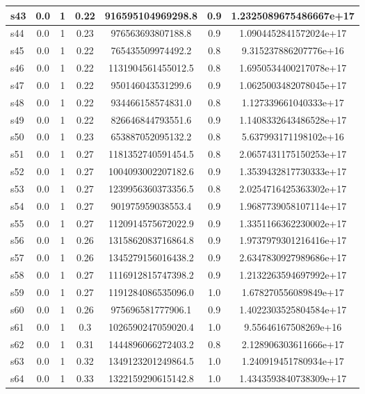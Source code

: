 \documentclass{article}
\begin{document}
\begin{tabular}{|l|c|c|c|c|c|c|}
\hline
s43 &0.0 & 1 & 0.22 & 916595104969298.8 & 0.9 & 1.2325089675486667e+17\\
\hline
s44 &0.0 & 1 & 0.23 & 976563693807188.8 & 0.9 & 1.0904452841572024e+17\\
\hline
s45 &0.0 & 1 & 0.22 & 765435509974492.2 & 0.8 & 9.315237886207776e+16\\
\hline
s46 &0.0 & 1 & 0.22 & 1131904561455012.5 & 0.8 & 1.6950534400217078e+17\\
\hline
s47 &0.0 & 1 & 0.22 & 950146043531299.6 & 0.9 & 1.0625003482078045e+17\\
\hline
s48 &0.0 & 1 & 0.22 & 934466158574831.0 & 0.8 & 1.127339661040333e+17\\
\hline
s49 &0.0 & 1 & 0.22 & 826646844793551.6 & 0.9 & 1.1408332643486528e+17\\
\hline
s50 &0.0 & 1 & 0.23 & 653887052095132.2 & 0.8 & 5.637993171198102e+16\\
\hline
s51 &0.0 & 1 & 0.27 & 1181352740591454.5 & 0.8 & 2.0657431175150253e+17\\
\hline
s52 &0.0 & 1 & 0.27 & 1004093002207182.6 & 0.9 & 1.3539432817730333e+17\\
\hline
s53 &0.0 & 1 & 0.27 & 1239956360373356.5 & 0.8 & 2.0254716425363302e+17\\
\hline
s54 &0.0 & 1 & 0.27 & 901975959038553.4 & 0.9 & 1.9687739058107114e+17\\
\hline
s55 &0.0 & 1 & 0.27 & 1120914575672022.9 & 0.9 & 1.3351166362230002e+17\\
\hline
s56 &0.0 & 1 & 0.26 & 1315862083716864.8 & 0.9 & 1.9737979301216416e+17\\
\hline
s57 &0.0 & 1 & 0.26 & 1345279156016438.2 & 0.9 & 2.6347830927989686e+17\\
\hline
s58 &0.0 & 1 & 0.27 & 1116912815747398.2 & 0.9 & 1.2132263594697992e+17\\
\hline
s59 &0.0 & 1 & 0.27 & 1191284086535096.0 & 1.0 & 1.678270556089849e+17\\
\hline
s60 &0.0 & 1 & 0.26 & 975696581777906.1 & 0.9 & 1.4022303525804584e+17\\
\hline
s61 &0.0 & 1 & 0.3 & 1026590247059020.4 & 1.0 & 9.55646167508269e+16\\
\hline
s62 &0.0 & 1 & 0.31 & 1444896066272403.2 & 0.8 & 2.128906303611666e+17\\
\hline
s63 &0.0 & 1 & 0.32 & 1349123201249864.5 & 1.0 & 1.240919451780934e+17\\
\hline
s64 &0.0 & 1 & 0.33 & 1322159290615142.8 & 1.0 & 1.4343593840738309e+17\\

\end{tabular}
\end{document}
